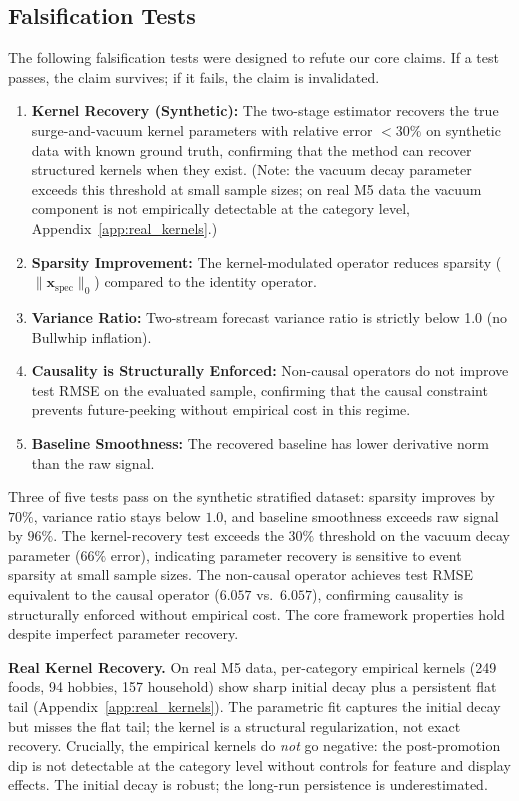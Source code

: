 \documentclass[10pt]{article} %
\theoremstyle{plain}
\theoremstyle{definition}
\newcommand{\xspec}{\mathbf{x}_{\text{spec}}}
\begin{document}
\subsection{Falsification Tests}

The following falsification tests were designed to refute our core claims. If a test passes, the claim survives; if it fails, the claim is invalidated.

\begin{enumerate}
  \item \textbf{Kernel Recovery (Synthetic):} The two-stage estimator recovers the true surge-and-vacuum kernel parameters with relative error $< 30\%$ on synthetic data with known ground truth, confirming that the method can recover structured kernels when they exist. (Note: the vacuum decay parameter exceeds this threshold at small sample sizes; on real M5 data the vacuum component is not empirically detectable at the category level, Appendix~\ref{app:real_kernels}.)
  \item \textbf{Sparsity Improvement:} The kernel-modulated operator reduces sparsity ($\|\xspec\|_0$) compared to the identity operator.
  \item \textbf{Variance Ratio:} Two-stream forecast variance ratio is strictly below 1.0 (no Bullwhip inflation).
  \item \textbf{Causality is Structurally Enforced:} Non-causal operators do not improve test RMSE on the evaluated sample, confirming that the causal constraint prevents future-peeking without empirical cost in this regime.
  \item \textbf{Baseline Smoothness:} The recovered baseline has lower derivative norm than the raw signal.
\end{enumerate}

Three of five tests pass on the synthetic stratified dataset: sparsity improves by $70\%$, variance ratio stays below $1.0$, and baseline smoothness exceeds raw signal by $96\%$. The kernel-recovery test exceeds the $30\%$ threshold on the vacuum decay parameter ($66\%$ error), indicating parameter recovery is sensitive to event sparsity at small sample sizes. The non-causal operator achieves test RMSE equivalent to the causal operator ($6.057$ vs.~$6.057$), confirming causality is structurally enforced without empirical cost. The core framework properties hold despite imperfect parameter recovery.

\textbf{Real Kernel Recovery.} On real M5 data, per-category empirical kernels (249 foods, 94 hobbies, 157 household) show sharp initial decay plus a persistent flat tail (Appendix~\ref{app:real_kernels}). The parametric fit captures the initial decay but misses the flat tail; the kernel is a structural regularization, not exact recovery. Crucially, the empirical kernels do \emph{not} go negative: the post-promotion dip is not detectable at the category level without controls for feature and display effects. The initial decay is robust; the long-run persistence is underestimated.
\end{document}
